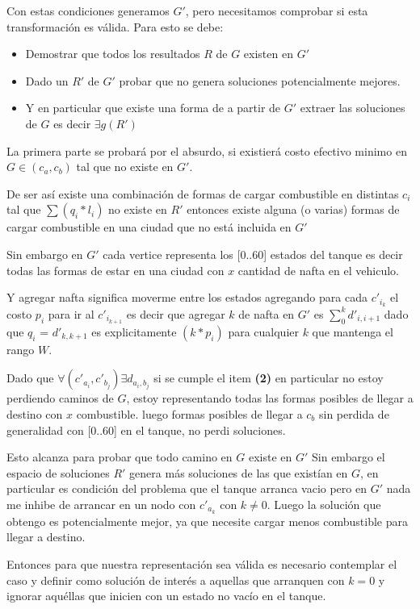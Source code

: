 \documentclass[12pt]{article}
\begin{document}
Con estas condiciones generamos $G'$, pero necesitamos comprobar si esta transformación es válida. Para esto se debe:

\begin{itemize}
 \item Demostrar que todos los resultados $R$ de $G$ existen en $G'$  
 \item Dado un $R'$ de $G'$ probar que no genera soluciones potencialmente mejores.
 \item Y en particular que existe una forma de a partir de $G'$ extraer las soluciones de $G$ es decir $\exists g(R')$
\end{itemize}

La primera parte se probará por el absurdo, si existierá costo efectivo minimo en $G \in (c_a,c_b)$ tal que no existe en $G'$.

De ser así existe una combinación de formas de cargar combustible en distintas $c_i$ tal que $\sum (q_i * l_i)$ no existe en $R'$ entonces existe alguna (o varias) formas de cargar combustible en una ciudad que no está incluida en $G'$

Sin embargo en $G'$ cada vertice representa los [0..60] estados del tanque es decir todas las formas de estar en una ciudad con $x$ cantidad de nafta en el vehiculo.

Y agregar nafta significa moverme entre los estados agregando para cada $c'_{i_k}$ el costo $p_i$ para ir al $c'_{i_{k+1}}$ es decir que agregar $k$ de nafta en $G'$ es $\sum_0^k d'_{i,i+1}$ dado que $q_i$ = $d'_{k,k+1}$ es explicitamente $(k * p_i)$ para cualquier $k$ que mantenga el rango $W$.

Dado que $\forall (c'_{a_i}, c'_{b_j}) \exists d_{a_i,b_j}$ si se cumple el item \textbf{(2)} en particular no estoy perdiendo caminos de $G$, estoy representando todas las formas posibles de llegar a destino con $x$ combustible. luego formas posibles de llegar a $c_{b}$ sin perdida de generalidad con [0..60] en el tanque, no perdi soluciones.

Esto alcanza para probar que todo camino en $G$ existe en $G'$ Sin embargo el espacio de soluciones $R'$ genera más soluciones de las que existían en $G$, en particular es condición del problema que el tanque arranca vacio pero en $G'$ nada me inhibe de arrancar en un nodo con $c'_{a_k}$ con $k \neq 0$. Luego la solución que obtengo es potencialmente mejor, ya que necesite cargar menos combustible para llegar a destino.

Entonces para que nuestra representación sea válida es necesario contemplar el caso y definir como solución de interés a aquellas que arranquen con $k = 0$ y ignorar aquéllas que inicien con un estado no vacío en el tanque.
\end{document}
